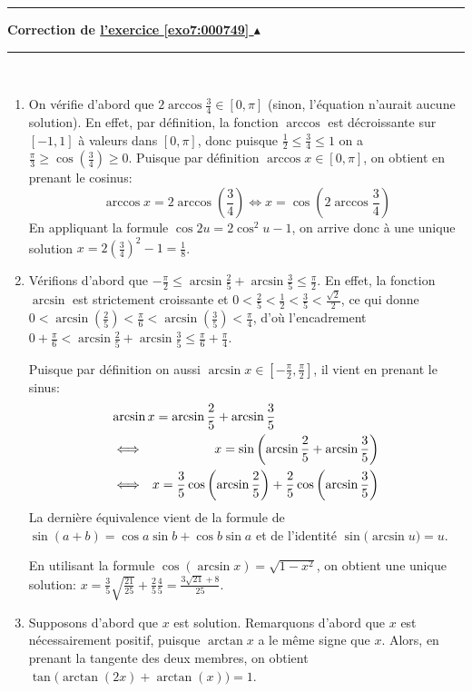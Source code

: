 \documentclass[11pt,a4paper]{article}
\renewcommand{\ge}{\geqslant} \renewcommand{\geq}{\geqslant}
\renewcommand{\le}{\leqslant} \renewcommand{\leq}{\leqslant}
\newcommand{\Arcsin}{\mathop{\mathrm{arcsin}}\nolimits}
\newcommand{\Arccos}{\mathop{\mathrm{arccos}}\nolimits}
\newcommand{\Arctan}{\mathop{\mathrm{arctan}}\nolimits}
\newcounter{exo}
\newcommand{\correction}[1]{\hypertarget{cor7:#1}{}\label{cor7:#1}{\bf Correction de \hyperlink{exo7:#1}{l'exercice \ref{exo7:#1} $\blacktriangle$}}\vspace{1mm}\hrule\vspace{1mm}}
\newcommand{\fincorrection}{\vspace{1mm}\hrule\vspace*{7mm}}
\begin{document}
\fincorrection
\correction{000749}\
\begin{enumerate}
\item On vérifie d'abord que $2\Arccos \frac{3}{4}\in[0,\pi]$ (sinon, l'équation 
n'aurait aucune solution). En effet, par définition, la fonction $\Arccos$ est décroissante 
sur $[-1,1]$ à valeurs dans $[0,\pi]$, donc puisque $\frac{1}{2}\le\frac{3}{4}\le 1$ 
on a $\frac{\pi}{3}\ge\cos\left(\frac{3}{4}\right)\ge 0$.
Puisque par définition $\Arccos x\in[0,\pi]$, on obtient en prenant le cosinus:
$$\Arccos x = 2\Arccos\left(\frac{3}{4}\right)\Longleftrightarrow x 
= \cos\left(2\Arccos \frac{3}{4}\right)$$
En appliquant la formule $\cos 2u = 2\cos^2u-1$, on arrive  donc \`a une unique solution
$x = 2(\frac{3}{4})^2-1 = \frac{1}{8}$.
\item Vérifions d'abord que $-\frac{\pi}{2}\le\Arcsin \frac{2}{5} + \Arcsin \frac{3}{5}\le\frac{\pi}{2}$. 
En effet, la fonction $\Arcsin$ est strictement croissante et 
$0<\frac{2}{5}<\frac{1}{2}<\frac{3}{5}<\frac{\sqrt{2}}{2}$, ce qui donne
$0<\Arcsin\left(\frac{2}{5}\right)<\frac{\pi}{6}<\Arcsin\left(\frac{3}{5}\right)<\frac{\pi}{4}$, 
d'où l'encadrement
$0+\frac{\pi}{6}<\Arcsin \frac{2}{5} + \Arcsin \frac{3}{5}\le\frac{\pi}{6}+\frac{\pi}{4}$.

Puisque par définition on aussi $\Arcsin x\in [-\frac{\pi}{2},\frac{\pi}{2}]$, 
il vient en prenant le sinus:
\begin{eqnarray*}
\lefteqn{\Arcsin x=\Arcsin \frac{2}{5} + \Arcsin \frac{3}{5}}\\
 &\Longleftrightarrow& x=\sin\left(\Arcsin \frac{2}{5} + \Arcsin \frac{3}{5}\right)\\
 &\Longleftrightarrow& x = \frac{3}{5}\cos\left(\Arcsin \frac{2}{5}\right)+\frac{2}{5} \cos\left(\Arcsin \frac{3}{5}\right)
\end{eqnarray*}
La dernière équivalence vient de la formule de $\sin(a+b)= \cos a \sin b + \cos b \sin a$
et de l'identité $\sin\big( \Arcsin u\big) = u$.

En utilisant la formule $\cos\left(\Arcsin x\right) = \sqrt{1-x^2}$, 
on obtient une unique solution: $x = \frac35\sqrt{\frac{21}{25}}+\frac25\frac 45 
=\frac{3\sqrt{21}+8}{25}$.

\item Supposons d'abord que $x$ est solution. Remarquons d'abord que $x$ est 
nécessairement positif, puisque $\Arctan x$ a le même signe que $x$. 
Alors, en prenant la tangente des deux membres, on obtient $\tan\big(\Arctan(2x)+\Arctan(x)\big)=1$.


\end{enumerate}
\end{document}
